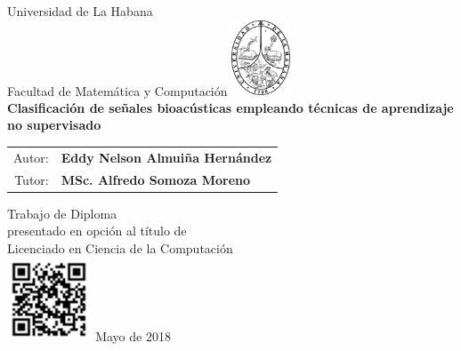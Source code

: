 \documentclass[11pt]{report}
\begin{document}
    \begin{titlepage}
        \begin{center}
        {\large Universidad de La Habana}
            \\ Facultad de Matemática y Computación
            \vskip 0.25cm
            \includegraphics[width=1.75cm]{images/uhlogo} \\
            \vfill
            {\LARGE \textbf{Clasificación de señales bioacústicas empleando técnicas de aprendizaje no supervisado}} \\
            \vskip 2cm
            \begin{tabular}{rl}
            {\Large Autor:}
                & {\Large \textbf{Eddy Nelson Almuiña Hernández}} \\
                \rule{0pt}{1cm}
                {\Large Tutor:} & {\Large \textbf{MSc. Alfredo Somoza Moreno}} \\
            \end{tabular}
            \vfill
            {\large Trabajo de Diploma \\presentado en opción al título de \\Licenciado en Ciencia de la Computación} \\
            \vskip 0.5cm
            \includegraphics[width=2.5cm]{images/qrcode}
            \vskip 0.5cm
            Mayo de 2018
        \end{center}
    \end{titlepage}
\end{document}
